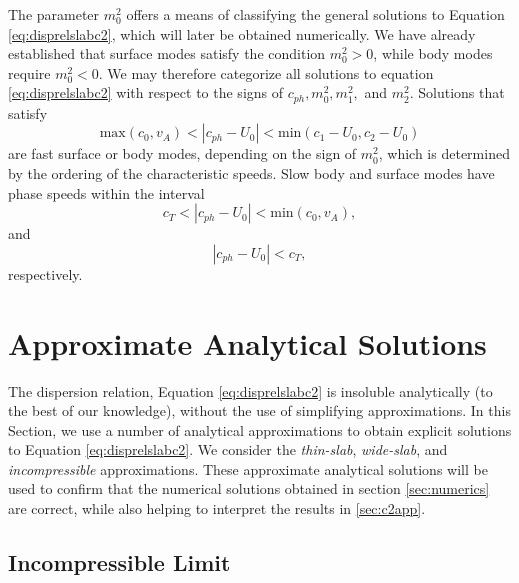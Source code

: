 \documentclass[12pt]{ociamthesis}
\begin{document}
The parameter $m_0^2$ offers a means of classifying the general solutions to Equation \eqref{eq:disprelslabc2}, which will later be obtained numerically.
We have already established that surface modes satisfy the condition $m_0^2 > 0$, while body modes require $m_0^2 < 0$.
We may therefore categorize all solutions to equation \eqref{eq:disprelslabc2} with respect to the signs of $c_{ph}, m_0^2, m_1^2,$ and $m_2^2$.
Solutions that satisfy
%
\begin{equation}
\textrm{max}(c_0, v_A) < |c_{ph} - U_0| < \textrm{min}(c_1 - U_0, c_2 - U_0)
\end{equation}
%
are fast surface or body modes, depending on the sign of $m_0^2$, which is determined by the ordering of the characteristic speeds.
Slow body and surface modes have phase speeds within the interval 
%
\begin{equation}
c_T < |c_{ph} - U_0| < \textrm{min}(c_0, v_A),
\end{equation}
%
and
%
\begin{equation}
|c_{ph} - U_0| < c_T,
\end{equation}
%
respectively.



\section{Approximate Analytical Solutions}
\label{sec:analytical}

The dispersion relation, Equation \eqref{eq:disprelslabc2} is insoluble analytically (to the best of our knowledge), without the use of simplifying approximations.
In this Section, we use a number of analytical approximations to obtain explicit solutions to Equation \eqref{eq:disprelslabc2}.
We consider the \emph{thin-slab}, \emph{wide-slab}, and \emph{incompressible} approximations.
These approximate analytical solutions will be used to confirm that the numerical solutions obtained in section \ref{sec:numerics} are correct, while also helping to interpret the results in \ref{sec:c2app}.



\subsection{Incompressible Limit}
\label{subsec:incompressible}
\end{document}
